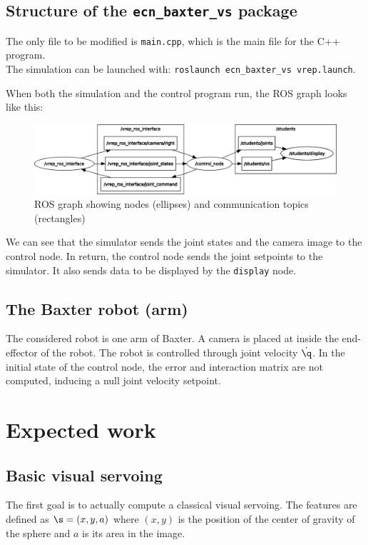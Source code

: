 \documentclass{ecnreport}
\begin{document}
\subsection{Structure of the \texttt{ecn\_baxter\_vs} package}

The only file to be modified is \texttt{main.cpp}, which is the main file for the C++ program. \\
The simulation can be launched with: \texttt{roslaunch ecn\_baxter\_vs vrep.launch}.

When both the simulation and the control program run, the ROS graph looks like this:

\begin{figure}[h!]\centering
 \includegraphics[width=.6\linewidth]{rosgraph}
 \caption{ROS graph showing nodes (ellipses) and communication topics (rectangles)}
 \label{fig:rosgraph}
\end{figure}

We can see that the simulator sends the joint states and the camera image to the control node. In return, the control node sends the joint setpoints
to the simulator. It also sends data to be displayed by the \texttt{display} node.\\


\subsection{The Baxter robot (arm)}

The considered robot is one arm of Baxter. A camera is placed at inside the end-effector of the robot.
 The robot is controlled through joint velocity $\dot \q$.
 In the initial state of the control node, the error and interaction matrix are not computed, inducing a null joint velocity setpoint.
 
\section{Expected work}

\subsection{Basic visual servoing}

The first goal is to actually compute a classical visual servoing. The features are defined as $\s = (x, y, a)$ where $(x,y)$ is the position of the center of gravity of the sphere and $a$ is its area in the image.
\end{document}
